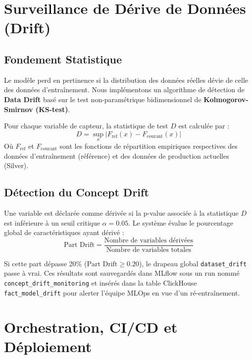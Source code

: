 \documentclass[12pt]{report}
\begin{document}
\chapter{Surveillance de Dérive de Données (Drift)}

\section{Fondement Statistique}
Le modèle perd en pertinence si la distribution des données réelles dévie de celle des données d'entraînement. Nous implémentons un algorithme de détection de \textbf{Data Drift} basé sur le test non-paramétrique bidimensionnel de \textbf{Kolmogorov-Smirnov (KS-test)}.

Pour chaque variable de capteur, la statistique de test $D$ est calculée par :
\begin{equation}
D = \sup_{x} |F_{\text{ref}}(x) - F_{\text{courant}}(x)|
\end{equation}
Où $F_{\text{ref}}$ et $F_{\text{courant}}$ sont les fonctions de répartition empiriques respectives des données d'entraînement (référence) et des données de production actuelles (Silver).

\section{Détection du Concept Drift}
Une variable est déclarée comme dérivée si la p-value associée à la statistique $D$ est inférieure à un seuil critique $\alpha = 0.05$. Le système évalue le pourcentage global de caractéristiques ayant dérivé :
\begin{equation}
\text{Part Drift} = \frac{\text{Nombre de variables dérivées}}{\text{Nombre de variables totales}}
\end{equation}

Si cette part dépasse 20\% ($\text{Part Drift} \ge 0.20$), le drapeau global \texttt{dataset\_drift} passe à vrai. Ces résultats sont sauvegardés dans MLflow sous un run nommé \texttt{concept\_drift\_monitoring} et insérés dans la table ClickHouse \texttt{fact\_model\_drift} pour alerter l'équipe MLOps en vue d'un ré-entraînement.


\chapter{Orchestration, CI/CD et Déploiement}
\end{document}
